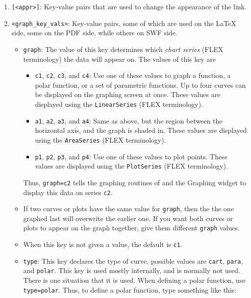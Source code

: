 \documentclass{article}
\begin{document}
\begin{enumerate}
  \item \texttt{[<appr>]}: Key-value pairs that are used to change the appearance of the link.
  \item \texttt{<graph\_key\_vals>}: Key-value pairs, some of which are used on the {\LaTeX} side,
    some on the PDF side, while others on SWF side.
    \begin{itemize}

    \item\texttt{graph}: The value of this key determines which
        \emph{chart series} (FLEX terminology) the data will appear
        on. The values of this key are
        \begin{itemize}
          \item \texttt{c1}, \texttt{c2}, \texttt{c3}, and \texttt{c4}:
          Use one of these values to graph a function, a polar function,
          or a set of parametric functions. Up to four curves can be displayed
          on the graphing screen at once. These values are displayed using
          the \texttt{LinearSeries} (FLEX terminology).
          \item \texttt{a1}, \texttt{a2}, \texttt{a3}, and \texttt{a4}:
          Same as above, but the region between the horizontal axis, and
          the graph is shaded in. These values are displayed using
          the \texttt{AreaSeries} (FLEX terminology).
          \item \texttt{p1}, \texttt{p2}, \texttt{p3}, and \texttt{p4}:
          Use one of these values to plot points. These values are displayed using
          the \texttt{PlotSeries} (FLEX terminology).
        \end{itemize}
        Thus, \texttt{graph=c2} tells the graphing
        routines of {\AcroFLeX} and the {\AcroFLeX} Graphing widget
        to display this data on series \texttt{c2}.

    \item[] If two curves or plots have the same value for
        \texttt{graph}, then the the one graphed last will
        overwrite the earlier one. If you want both curves
        or plots to appear on the graph together, give them
        different \texttt{graph} values.

    \item[] When this key is not given a value, the default is
        \texttt{c1}.

    \item\texttt{type}: This key declares the type of curve,
        possible values are \texttt{cart}, \texttt{para}, and
        \texttt{polar}. This key is used mostly internally, and is
        normally not used. There is one situation that it is used. When
        defining a polar function, use \texttt{type=polar}. Thus, to
        define a polar function, type something like this:


\end{itemize}
\end{enumerate}
\end{document}
